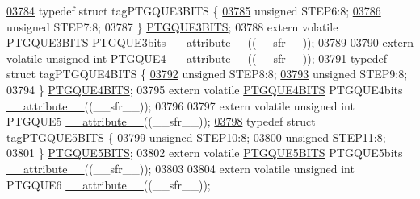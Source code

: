 \begin{DoxyCode}
\hypertarget{a00015_source_l03784}{}\hyperlink{a00014}{03784} \textcolor{keyword}{typedef} \textcolor{keyword}{struct }tagPTGQUE3BITS \{
\hypertarget{a00015_source_l03785}{}\hyperlink{a00014_af6169dff16fd1ea5e34a43bb97bd6218}{03785}   \textcolor{keywordtype}{unsigned} STEP6:8;
\hypertarget{a00015_source_l03786}{}\hyperlink{a00014_a4548344654e1258709b4f446bbe716df}{03786}   \textcolor{keywordtype}{unsigned} STEP7:8;
03787 \} \hyperlink{a00014_d4/d4f/a00673}{PTGQUE3BITS};
03788 \textcolor{keyword}{extern} \textcolor{keyword}{volatile} \hyperlink{a00014_d4/d4f/a00673}{PTGQUE3BITS} PTGQUE3bits \hyperlink{a00015_a493c46f03454991ccc5aa7a6e1dfb2a7}{\_\_attribute\_\_}((\_\_sfr\_\_));
03789 
03790 \textcolor{keyword}{extern} \textcolor{keyword}{volatile} \textcolor{keywordtype}{unsigned} \textcolor{keywordtype}{int}  PTGQUE4 \hyperlink{a00015_a493c46f03454991ccc5aa7a6e1dfb2a7}{\_\_attribute\_\_}((\_\_sfr\_\_));
\hypertarget{a00015_source_l03791}{}\hyperlink{a00014}{03791} \textcolor{keyword}{typedef} \textcolor{keyword}{struct }tagPTGQUE4BITS \{
\hypertarget{a00015_source_l03792}{}\hyperlink{a00014_aa67987ffd757f896712bf2aa6d181b7f}{03792}   \textcolor{keywordtype}{unsigned} STEP8:8;
\hypertarget{a00015_source_l03793}{}\hyperlink{a00014_a85e0900404fd65941708a683dfb7c06a}{03793}   \textcolor{keywordtype}{unsigned} STEP9:8;
03794 \} \hyperlink{a00014_d8/d73/a00674}{PTGQUE4BITS};
03795 \textcolor{keyword}{extern} \textcolor{keyword}{volatile} \hyperlink{a00014_d8/d73/a00674}{PTGQUE4BITS} PTGQUE4bits \hyperlink{a00015_a493c46f03454991ccc5aa7a6e1dfb2a7}{\_\_attribute\_\_}((\_\_sfr\_\_));
03796 
03797 \textcolor{keyword}{extern} \textcolor{keyword}{volatile} \textcolor{keywordtype}{unsigned} \textcolor{keywordtype}{int}  PTGQUE5 \hyperlink{a00015_a493c46f03454991ccc5aa7a6e1dfb2a7}{\_\_attribute\_\_}((\_\_sfr\_\_));
\hypertarget{a00015_source_l03798}{}\hyperlink{a00014}{03798} \textcolor{keyword}{typedef} \textcolor{keyword}{struct }tagPTGQUE5BITS \{
\hypertarget{a00015_source_l03799}{}\hyperlink{a00014_a4b2d9015c944b0299d72ebc25947fb2c}{03799}   \textcolor{keywordtype}{unsigned} STEP10:8;
\hypertarget{a00015_source_l03800}{}\hyperlink{a00014_ad3492a875ce1cd997d197ee57c972b55}{03800}   \textcolor{keywordtype}{unsigned} STEP11:8;
03801 \} \hyperlink{a00014_d6/da1/a00675}{PTGQUE5BITS};
03802 \textcolor{keyword}{extern} \textcolor{keyword}{volatile} \hyperlink{a00014_d6/da1/a00675}{PTGQUE5BITS} PTGQUE5bits \hyperlink{a00015_a493c46f03454991ccc5aa7a6e1dfb2a7}{\_\_attribute\_\_}((\_\_sfr\_\_));
03803 
03804 \textcolor{keyword}{extern} \textcolor{keyword}{volatile} \textcolor{keywordtype}{unsigned} \textcolor{keywordtype}{int}  PTGQUE6 \hyperlink{a00015_a493c46f03454991ccc5aa7a6e1dfb2a7}{\_\_attribute\_\_}((\_\_sfr\_\_));

\end{DoxyCode}
